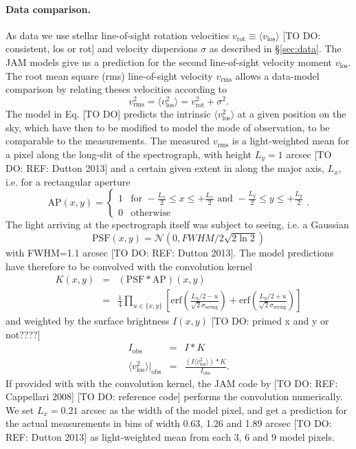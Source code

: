 \paragraph{Data comparison.} As data we use stellar line-of-sight rotation velocities $v_\text{rot} \equiv \langle v_\text{los} \rangle$ [TO DO: consistent, los or rot] and velocity dispersions $\sigma$ as described in \S\ref{sec:data}. The JAM models give us a prediction for the second line-of-sight velocity moment $v_\text{los}$. The root mean square (rms) line-of-sight velocity $v_\text{rms}$ allows a data-model comparison by relating theses velocities according to 
\begin{equation*}
v_\text{rms}^2 = \langle v_\text{los}^2 \rangle = v_\text{rot}^2 + \sigma^2.
\end{equation*}
The model in Eq. [TO DO] predicts the intrinsic $\langle v_\text{los}^2 \rangle$ at a given position on the sky, which have then to be modified to model the mode of observation, to be comparable to the measurements. The measured $v_\text{rms}$ is a light-weighted mean for a pixel along the long-slit of the spectrograph, with height $L_y = 1$ arcsec [TO DO: REF: Dutton 2013] and a certain given extent in along the major axis, $L_x$, i.e. for a rectangular aperture
\begin{equation*}
\text{AP}(x,y) = \left\{ \begin{array}{ll} 1 & \text{for } -\frac{L_x}{2} \leq x \leq + \frac{L_x}{2} \text{ and } - \frac{L_y}{2} \leq y \leq + \frac{L_y}{2}  \\ 0 & \text{otherwise} \end{array} \right. .
\end{equation*}
The light arriving at the spectrograph itself was subject to seeing, i.e. a Gaussian 
\begin{equation*}
\text{PSF}(x,y)=\mathscr{N}(0,FWHM/2\sqrt{2\ln2})
\end{equation*}
with FWHM=1.1 arcsec  [TO DO: REF: Dutton 2013]. The model predictions have therefore to be convolved with the convolution kernel
\begin{eqnarray*}
K(x,y) &=& (\text{PSF} \ast \text{AP})(x,y) \\
&=& \frac{1}{4} \prod_{u \in \{x,y\}} \left[ \text{erf}\left( \frac{L_u/2 - u}{\sqrt{2}\sigma_\text{seeing}}\right) + \text{erf} \left( \frac{L_u/2 + u}{\sqrt{2} \sigma_\text{seeing}} \right) \right]
\end{eqnarray*}
and weighted by the surface brightness $I(x,y)$ [TO DO: primed x and y or not????]
\begin{eqnarray*}
I_\text{obs} &=& I \ast K\\
\langle v_\text{los}^2 \rangle |_\text{obs} &=& \frac{(I \langle v_\text{los}^2\rangle) \ast K}{I_\text{obs}}.
\end{eqnarray*}
If provided with with the convolution kernel, the JAM code by [TO DO: REF: Cappellari 2008] [TO DO: reference code] performs the convolution numerically. We set $L_x = 0.21$ arcsec as the width of the model pixel, and get a prediction for the actual measurements in bins of width 0.63, 1.26 and 1.89 arcsec [TO DO: REF: Dutton 2013] as light-weighted mean from each 3, 6 and 9 model pixels.